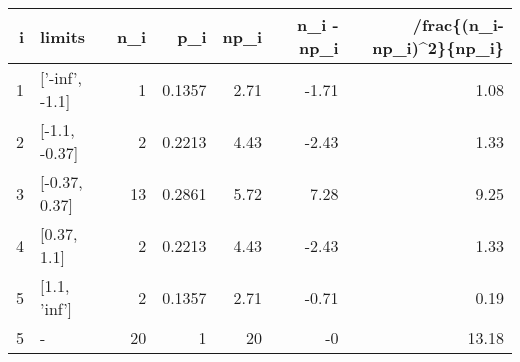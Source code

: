 \begin{tabular}{rlrrrrr}
\hline
   i & limits         &   n\_i &    p\_i &   np\_i &   n\_i - np\_i &   /frac\{(n\_i-np\_i)\^{}2\}\{np\_i\} \\
\hline
   1 & ['-inf', -1.1] &     1 & 0.1357 &   2.71 &        -1.71 &                        1.08 \\
   2 & [-1.1, -0.37]  &     2 & 0.2213 &   4.43 &        -2.43 &                        1.33 \\
   3 & [-0.37, 0.37]  &    13 & 0.2861 &   5.72 &         7.28 &                        9.25 \\
   4 & [0.37, 1.1]    &     2 & 0.2213 &   4.43 &        -2.43 &                        1.33 \\
   5 & [1.1, 'inf']   &     2 & 0.1357 &   2.71 &        -0.71 &                        0.19 \\
   5 & -              &    20 & 1      &  20    &        -0    &                       13.18 \\
\hline
\end{tabular}